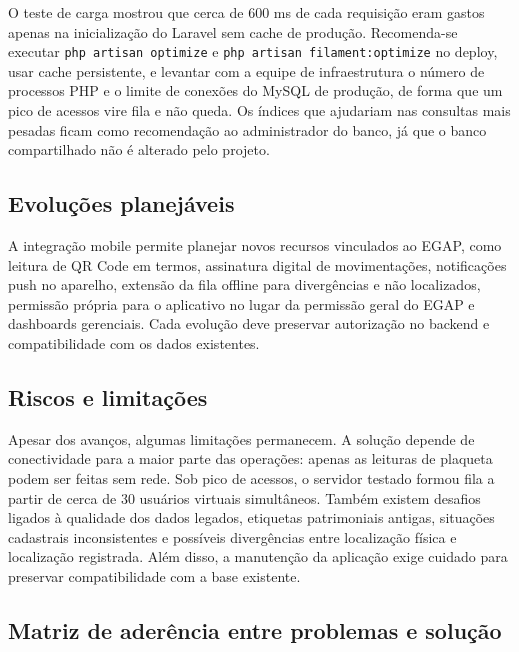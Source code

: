 \documentclass[12pt,a4paper]{article}
\begin{document}
O teste de carga mostrou que cerca de 600 ms de cada requisição eram gastos apenas na inicialização do Laravel sem cache de produção. Recomenda-se executar \texttt{php artisan optimize} e \texttt{php artisan filament:optimize} no deploy, usar cache persistente, e levantar com a equipe de infraestrutura o número de processos PHP e o limite de conexões do MySQL de produção, de forma que um pico de acessos vire fila e não queda. Os índices que ajudariam nas consultas mais pesadas ficam como recomendação ao administrador do banco, já que o banco compartilhado não é alterado pelo projeto.

\subsection{Evoluções planejáveis}

A integração mobile permite planejar novos recursos vinculados ao EGAP, como leitura de QR Code em termos, assinatura digital de movimentações, notificações push no aparelho, extensão da fila offline para divergências e não localizados, permissão própria para o aplicativo no lugar da permissão geral do EGAP e dashboards gerenciais. Cada evolução deve preservar autorização no backend e compatibilidade com os dados existentes.

\subsection{Riscos e limitações}

Apesar dos avanços, algumas limitações permanecem. A solução depende de conectividade para a maior parte das operações: apenas as leituras de plaqueta podem ser feitas sem rede. Sob pico de acessos, o servidor testado formou fila a partir de cerca de 30 usuários virtuais simultâneos. Também existem desafios ligados à qualidade dos dados legados, etiquetas patrimoniais antigas, situações cadastrais inconsistentes e possíveis divergências entre localização física e localização registrada. Além disso, a manutenção da aplicação exige cuidado para preservar compatibilidade com a base existente.

\subsection{Matriz de aderência entre problemas e solução}
\end{document}
